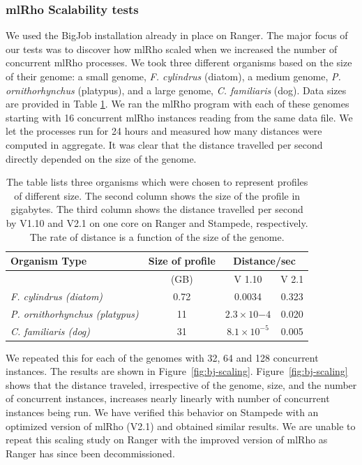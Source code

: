 \documentclass{sig-alternate}
\begin{document}
\subsubsection{mlRho Scalability tests}
\label{sec:scalability}
We used the BigJob installation already in place on Ranger. The major focus of our tests was to discover how
mlRho scaled when we increased the number of concurrent mlRho processes. We took three different organisms
based on the size of their genome: a small genome, {\it F. cylindrus} (diatom), a medium genome, {\it
P. ornithorhynchus} (platypus), and a large genome, {\it C. familiaris} (dog). Data sizes are provided in Table
\ref{table:cache_comp}. We ran the mlRho program with each of these genomes starting with 16 concurrent mlRho
instances reading from the same data file. We let the processes run for 24 hours and measured how many
distances were computed in aggregate. It was clear that the distance travelled per second directly depended on the size of the genome.
\begin{table}[h]
\centering
\begin{tabular}{|p{3cm}|c| c |c  |     } \hline
{ Organism Type	}	& { Size of profile}& \multicolumn{2}{|c|}{{ Distance/sec} } \\ \hline
	& { (GB)}  & { V 1.10} & { V 2.1} \\ \hline
{ {\it F. cylindrus (diatom)} } & { 0.72  }& { 0.0034} & { 0.323} \\ \hline
{ {\it P. ornithorhynchus (platypus)} } & { 11 } &{ $2.3{\times}10{-4}$ }&  { 0.020} \\ \hline
{ {\it C. familiaris (dog)} } & { 31} & { $8.1{\times}10^{-5}$} & { 0.005} \\
\hline

\end{tabular}
\caption{The table lists three organisms which were chosen to represent profiles of different size. The second column shows the size of the profile in gigabytes. The third column shows the distance travelled per second by V1.10 and V2.1 on one core on Ranger and Stampede, respectively. The rate of distance is a function of the size of the genome.  } 
\label{table:cache_comp}
\end{table}

 We repeated this for each of the genomes with 32, 64 and 128
concurrent instances. The results are shown in Figure~\ref{fig:bj-scaling}. Figure~\ref{fig:bj-scaling} shows that the distance traveled, irrespective of the genome, size, and the number of concurrent instances, increases
nearly linearly with number of concurrent instances being run. We have verified this behavior on Stampede with
an optimized version of mlRho (V2.1) and obtained similar results. We are unable to repeat this scaling study on
Ranger with the improved version of mlRho as Ranger has since been decommissioned.
\end{document}
